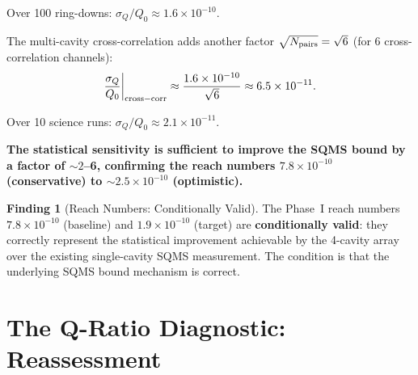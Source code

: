 \documentclass[11pt]{article}
\newcommand{\ee}[1]{\times 10^{#1}}
\theoremstyle{definition}
\newtheorem{finding}[theorem]{Finding}
\theoremstyle{remark}
\begin{document}
Over 100 ring-downs: $\sigma_Q/Q_0 \approx 1.6\ee{-10}$.

The multi-cavity cross-correlation adds another factor
$\sqrt{N_{\rm pairs}} = \sqrt{6}$ (for 6 cross-correlation channels):
\begin{equation}
\frac{\sigma_Q}{Q_0}\bigg|_{\rm cross-corr} \approx
\frac{1.6\ee{-10}}{\sqrt{6}} \approx 6.5\ee{-11}.
\end{equation}

Over 10 science runs: $\sigma_Q/Q_0 \approx 2.1\ee{-11}$.

\textbf{The statistical sensitivity is sufficient to improve the
SQMS bound by a factor of $\sim 2$--6, confirming the reach numbers
$7.8\ee{-10}$ (conservative) to $\sim 2.5\ee{-10}$ (optimistic).}

\begin{finding}[Reach Numbers: Conditionally Valid]
\label{find:reach}
The Phase~I reach numbers $7.8\ee{-10}$ (baseline) and $1.9\ee{-10}$
(target) are \textbf{conditionally valid}: they correctly represent
the statistical improvement achievable by the 4-cavity array over the
existing single-cavity SQMS measurement. The condition is that the
underlying SQMS bound mechanism is correct.
\end{finding}


\section{The Q-Ratio Diagnostic: Reassessment}
\label{sec:q_ratio_reassess}
\end{document}
